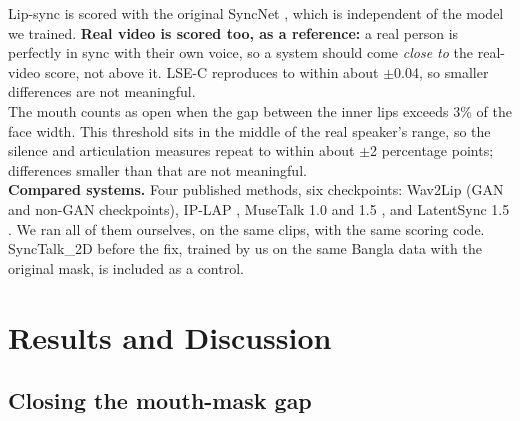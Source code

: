 \noindent
Lip-sync is scored with the original SyncNet \cite{chung2016outoftime}, which is independent of the model we trained. \textbf{Real video is scored too, as a reference:} a real person is perfectly in sync with their own voice, so a system should come \textit{close to} the real-video score, not above it. LSE-C reproduces to within about $\pm$0.04, so smaller differences are not meaningful.\\

\noindent
The mouth counts as open when the gap between the inner lips exceeds 3\% of the face width. This threshold sits in the middle of the real speaker's range, so the silence and articulation measures repeat to within about $\pm$2 percentage points; differences smaller than that are not meaningful.\\

\noindent
\textbf{Compared systems.} Four published methods, six checkpoints: Wav2Lip \cite{prajwal2020wav2lip} (GAN and non-GAN checkpoints), IP-LAP \cite{zhong2023iplap}, MuseTalk 1.0 and 1.5 \cite{zhang2024musetalk}, and LatentSync 1.5 \cite{li2024latentsync}. We ran all of them ourselves, on the same clips, with the same scoring code. SyncTalk\_2D before the fix, trained by us on the same Bangla data with the original mask, is included as a control.

\section{Results and Discussion}
\label{sec:results}

\subsection{Closing the mouth-mask gap}
\label{sec:maskfix}

